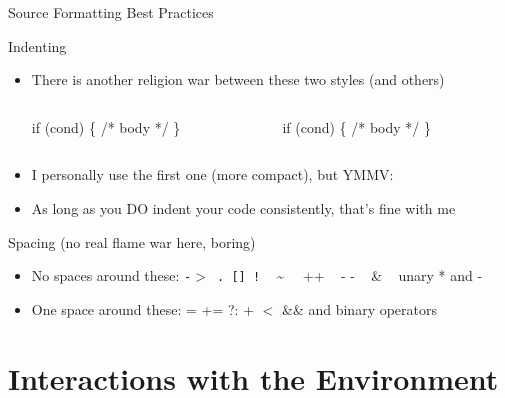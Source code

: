 \begin{Coupe}
\begin{frame}[fragile]{Source Formatting Best Practices}
  \begin{block}{Indenting}
    \begin{itemize}
    \item There is another religion war between these two styles (and others)
      \begin{columns}
        \begin{column}{.45\linewidth}
          \begin{boitecode}{}
if (cond) \{
  /* body */
\}            

          \end{boitecode}
        \end{column}
        \begin{column}{.45\linewidth}
          \begin{boitecode}{}
if (cond)
  \{
    /* body */
  \}

          \end{boitecode}
        \end{column}
      \end{columns}
      \vspace{-.7\baselineskip}
    \item I personally use the first one (more compact), but YMMV:
    \item As long as you DO indent your code consistently, that's fine with me
    \end{itemize}
  \end{block}\vspace{-.7\baselineskip}
  \begin{block}{Spacing {\normalsize\color{black}(no real flame war here, boring)}}
    \begin{itemize}
    \item No spaces around these: \texttt{-$>$  .  []  !} ~
      \textasciitilde\ ~ ++ ~ - - ~ \& ~ unary * and -
    \item One space around these: = += ?: + $<$ \&\& and binary operators
    \end{itemize}
  \end{block}

\end{frame}
\section{Interactions with the Environment}\toc

\end{Coupe}
